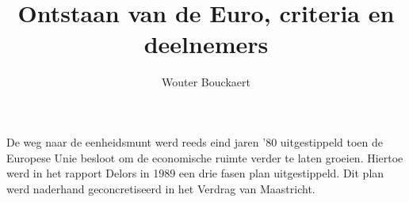 \documentclass[a4paper]{article}
\begin{document}
\title{Ontstaan van de Euro, criteria en deelnemers}
\author{Wouter Bouckaert}
\maketitle


De weg naar de eenheidsmunt werd reeds eind jaren '80 uitgestippeld
toen de Europese Unie besloot om de economische ruimte verder te
laten groeien. Hiertoe werd in het rapport Delors in 1989 een drie
fasen plan uitgestippeld. Dit plan werd naderhand geconcretiseerd in
het Verdrag van Maastricht.
\end{document}
